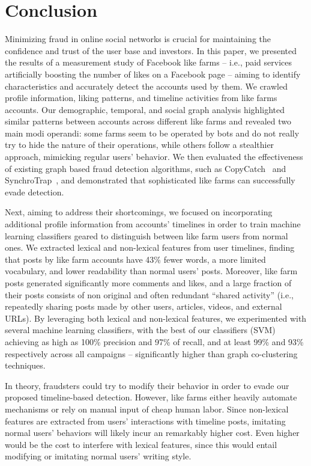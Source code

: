 \documentclass[twocolumn,10pt,letterpaper]{article}
\begin{document}
\section{Conclusion}
\label{sec:conclusion}
%
%
Minimizing fraud in online social networks is crucial for maintaining the confidence and trust of the user base and investors. In this paper, we presented the results of a measurement study of Facebook like farms -- i.e., paid services artificially boosting the number of likes on a Facebook page -- aiming to identify characteristics and accurately detect the accounts used by them.
We crawled profile information, liking patterns, and timeline activities from like farms accounts. Our demographic, temporal, and social graph analysis highlighted similar patterns between accounts across different like farms and revealed two main modi operandi: some farms seem to be operated by bots and do not really try to hide the nature of their operations, while others follow a stealthier approach, mimicking regular users' behavior.
%
We then evaluated the effectiveness of existing graph based fraud detection algorithms, such as CopyCatch~\cite{beutel2013copycatch} and SynchroTrap~\cite{cao14synchrotrap}, and demonstrated that sophisticated like farms can successfully evade detection.

Next, aiming to address their shortcomings, we  focused on incorporating additional profile information from accounts' timelines in order to train machine learning classifiers geared to distinguish between like farm users from normal ones.
%
%
We extracted lexical and non-lexical features from user timelines, finding that posts by like farm accounts have 43\% fewer words, a more limited vocabulary, and lower readability than normal users' posts. Moreover, like farm posts generated significantly more comments and likes, and a large fraction of their posts consists of non original and often redundant ``shared activity'' (i.e., repeatedly sharing posts made by other users, articles, videos, and external URLs). By leveraging both lexical and non-lexical features, we experimented with several machine learning classifiers, with the best of our classifiers (SVM) achieving as high as 100\% precision and 97\% of recall, and at least 99\% and 93\% respectively across all campaigns -- significantly higher than graph co-clustering techniques.

In theory, fraudsters could try to modify their behavior in order to evade our proposed timeline-based detection. However, like farms either heavily automate mechanisms or rely on manual input of cheap human labor. Since non-lexical features are extracted from users' interactions with timeline posts, imitating normal users' behaviors will likely incur an remarkably higher cost. Even higher would be the cost to interfere with lexical features, since this would entail modifying or imitating normal users' writing style.


%
 
\end{document}
